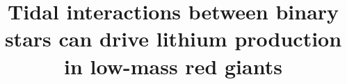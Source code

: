 \documentclass[twocolumn]{aastex62}
\begin{document}
\title{Tidal interactions between binary stars can drive lithium production in low-mass red giants}


\end{document}
